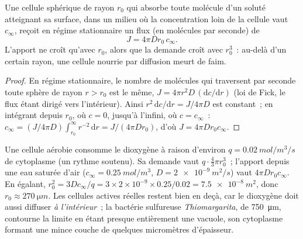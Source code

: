 \begin{theorem}\label{thm:b2:unicellular-diversity:supply}
Une cellule sphérique de rayon $r_0$ qui absorbe toute molécule d'un
soluté atteignant sa surface, dans un milieu où la concentration loin
de la cellule vaut $c_\infty$, reçoit en régime stationnaire un flux
(en molécules par seconde) de
\[
J = 4\pi D r_0\, c_\infty .
\]
L'apport ne croît qu'avec $r_0$, alors que la demande croît avec
$r_0^3$~: au-delà d'un certain rayon, une cellule nourrie par diffusion
meurt de faim.
\end{theorem}
\begin{proof}
En régime stationnaire, le nombre de molécules qui traversent par
seconde toute sphère de rayon $r > r_0$ est le même, $J = 4\pi r^2 D\,
(\mathrm{d}c/\mathrm{d}r)$ (loi de Fick, le flux étant dirigé vers
l'intérieur). Ainsi $r^2\,\mathrm{d}c/\mathrm{d}r = J/4\pi D$ est
constant~; en intégrant depuis $r_0$, où $c = 0$, jusqu'à l'infini, où
$c = c_\infty$~:
$c_\infty = (J/4\pi D)\int_{r_0}^{\infty} r^{-2}\,\mathrm{d}r =
J/(4\pi D r_0)$, d'où $J = 4\pi D r_0 c_\infty$.
\end{proof}

\begin{example}\label{ex:b2:unicellular-diversity:howbig}
Une cellule aérobie consomme le dioxygène à raison d'environ
$q = \qty{0.02}{mol/m^3/s}$ de cytoplasme (un rythme soutenu). Sa
demande vaut $q \cdot \tfrac{4}{3}\pi
r_0^3$~; l'apport depuis une eau saturée d'air ($c_\infty =
\qty{0.25}{mol/m^3}$, $D = \qty{2e-9}{m^2/s}$) vaut $4\pi D r_0
c_\infty$. En égalant, $r_0^2 = 3Dc_\infty/q = 3\times 2\times 10^{-9}
\times 0.25/0.02 = \qty{7.5e-8}{m^2}$, donc $r_0 \approx
\qty{270}{\micro m}$. Les cellules actives réelles restent bien en deçà,
car le dioxygène doit aussi diffuser \emph{à l'intérieur}~; la bactérie
sulfureuse \emph{Thiomargarita}, de \qty{750}{\micro m}, contourne la
limite en étant presque entièrement une vacuole, son cytoplasme formant
une mince couche de quelques micromètres d'épaisseur.
\end{example}

